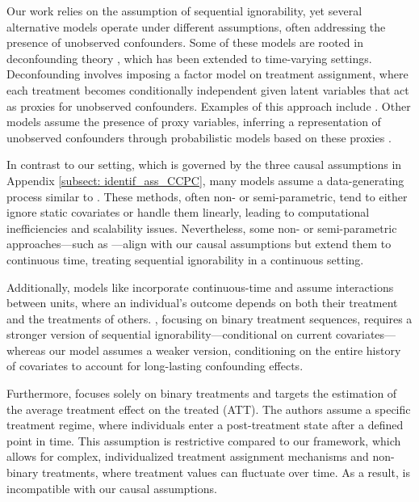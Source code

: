 \documentclass{article}
\theoremstyle{plain}
\theoremstyle{definition}
\theoremstyle{remark}
\begin{document}
Our work relies on the assumption of sequential ignorability, yet several alternative models operate under different assumptions, often addressing the presence of unobserved confounders. Some of these models are rooted in deconfounding theory \citep{lopezmultipletreatments, ranganath2018multiple, wang2019blessings}, which has been extended to time-varying settings. Deconfounding involves imposing a factor model on treatment assignment, where each treatment becomes conditionally independent given latent variables that act as proxies for unobserved confounders. Examples of this approach include \cite{Bica2020TimeSDecounf, hatt2021sequential, cao2023estimating}. Other models assume the presence of proxy variables, inferring a representation of unobserved confounders through probabilistic models based on these proxies \citep{veitch2020adapting, LuChengCMAproxynConf20121, kuzmanovic2021deconfounding}.

In contrast to our setting, which is governed by the three causal assumptions in Appendix \ref{subsect: identif_ass_CCPC}, many models assume a data-generating process similar to \citep{Soleimani2017TreatmentResponseMF,soleimani2017scalable, qian2021synctwin}. These methods, often non- or semi-parametric, tend to either ignore static covariates or handle them linearly, leading to computational inefficiencies and scalability issues. Nevertheless, some non- or semi-parametric approaches—such as \cite{schulam2017reliable, seedat2022continuous,de2022predicting, hizli2023causal}—align with our causal assumptions but extend them to continuous time, treating sequential ignorability in a continuous setting.

Additionally, models like \cite{JiangCF-GODE2023} incorporate continuous-time and assume interactions between units, where an individual’s outcome depends on both their treatment and the treatments of others. \cite{berrevoets2021disentangled}, focusing on binary treatment sequences, requires a stronger version of sequential ignorability—conditional on current covariates—whereas our model assumes a weaker version, conditioning on the entire history of covariates to account for long-lasting confounding effects. 

Furthermore, \cite{chen2023multi} focuses solely on binary treatments and targets the estimation of the average treatment effect on the treated (ATT). The authors assume a specific treatment regime, where individuals enter a post-treatment state after a defined point in time. This assumption is restrictive compared to our framework, which allows for complex, individualized treatment assignment mechanisms and non-binary treatments, where treatment values can fluctuate over time. As a result, \cite{chen2023multi} is incompatible with our causal assumptions.
\end{document}

